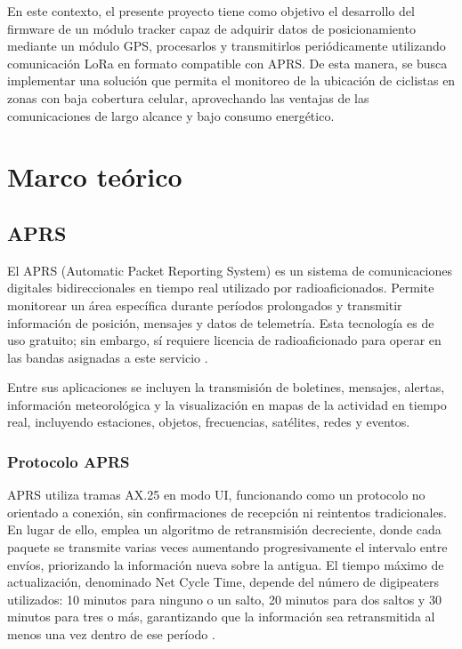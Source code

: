 \documentclass[conference]{IEEEtran}
\begin{document}
En este contexto, el presente proyecto tiene como objetivo el desarrollo del firmware de un módulo tracker capaz de adquirir datos de posicionamiento mediante un módulo GPS, procesarlos y transmitirlos periódicamente utilizando comunicación LoRa en formato compatible con APRS. De esta manera, se busca implementar una solución que permita el monitoreo de la ubicación de ciclistas en zonas con baja cobertura celular, aprovechando las ventajas de las comunicaciones de largo alcance y bajo consumo energético.
\section{Marco teórico}

\subsection{APRS}

El APRS (Automatic Packet Reporting System) es un sistema de comunicaciones digitales bidireccionales en tiempo real utilizado por radioaficionados. Permite monitorear un área específica durante períodos prolongados y transmitir información de posición, mensajes y datos de telemetría. Esta tecnología es de uso gratuito; sin embargo, sí requiere licencia de radioaficionado para operar en las bandas asignadas a este servicio \cite{APRSorg}.

Entre sus aplicaciones se incluyen la transmisión de boletines, mensajes, alertas, información meteorológica y la visualización en mapas de la actividad en tiempo real, incluyendo estaciones, objetos, frecuencias, satélites, redes y eventos.

\subsubsection{Protocolo APRS}

APRS utiliza tramas AX.25 en modo UI, funcionando como un protocolo no orientado a conexión, sin confirmaciones de recepción ni reintentos tradicionales. En lugar de ello, emplea un algoritmo de retransmisión decreciente, donde cada paquete se transmite varias veces aumentando progresivamente el intervalo entre envíos, priorizando la información nueva sobre la antigua. El tiempo máximo de actualización, denominado Net Cycle Time, depende del número de digipeaters utilizados: 10 minutos para ninguno o un salto, 20 minutos para dos saltos y 30 minutos para tres o más, garantizando que la información sea retransmitida al menos una vez dentro de ese período \cite{BruningaAPRS}.
\end{document}
